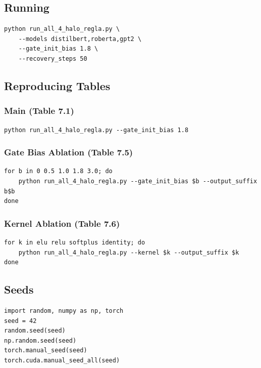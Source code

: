 \subsection{Running}

\begin{lstlisting}
python run_all_4_halo_regla.py \
    --models distilbert,roberta,gpt2 \
    --gate_init_bias 1.8 \
    --recovery_steps 50
\end{lstlisting}

\subsection{Reproducing Tables}

\subsubsection{Main (Table 7.1)}
\begin{lstlisting}
python run_all_4_halo_regla.py --gate_init_bias 1.8
\end{lstlisting}

\subsubsection{Gate Bias Ablation (Table 7.5)}
\begin{lstlisting}
for b in 0 0.5 1.0 1.8 3.0; do
    python run_all_4_halo_regla.py --gate_init_bias $b --output_suffix b$b
done
\end{lstlisting}

\subsubsection{Kernel Ablation (Table 7.6)}
\begin{lstlisting}
for k in elu relu softplus identity; do
    python run_all_4_halo_regla.py --kernel $k --output_suffix $k
done
\end{lstlisting}

\subsection{Seeds}

\begin{lstlisting}
import random, numpy as np, torch
seed = 42
random.seed(seed)
np.random.seed(seed)
torch.manual_seed(seed)
torch.cuda.manual_seed_all(seed)
\end{lstlisting}

